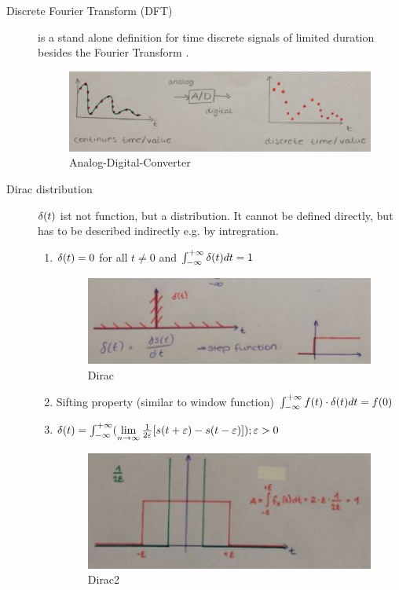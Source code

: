 \begin{description}
	\item[Discrete Fourier Transform (DFT)] is a stand alone definition for time discrete signals of limited duration besides the Fourier Transform .
		\begin{figure}[!h]
			\centering
			\includegraphics[width=0.7\linewidth]{images_LA/DFT}
			\caption{Analog-Digital-Converter}
			\label{fig:DFT}
		\end{figure}
	\item[Dirac distribution] $\delta(t)$ ist not function, but a distribution. It cannot be defined directly, but has to be described indirectly e.g. by intregration.
		\begin{enumerate}
			\item $ \delta(t)=0$ for all $t\neq0$ and $\int_{-\infty}^{+\infty}\delta(t) dt = 1 $
				\begin{figure}[!h]
					\centering
					\includegraphics[width=0.7\linewidth]{images_LA/dirac1}
					\caption{Dirac}
					\label{fig:dirac1}
				\end{figure}
			\item Sifting property (similar to window function)
			$\int_{-\infty}^{+\infty} f(t) \cdot \delta(t) dt = f(0) $
			\item $\delta(t) = \int_{-\infty}^{+\infty}(\lim\limits_{n \to \infty} \frac{1}{2\varepsilon}[s(t+\varepsilon)-s(t-\varepsilon)] ); \varepsilon>0 $
				\begin{figure}[!h]
					\centering
					\includegraphics[width=0.7\linewidth]{images_LA/dirac2}
					\caption{Dirac2}
					\label{fig:dirac2}

\end{figure}
\end{enumerate}
\end{description}

